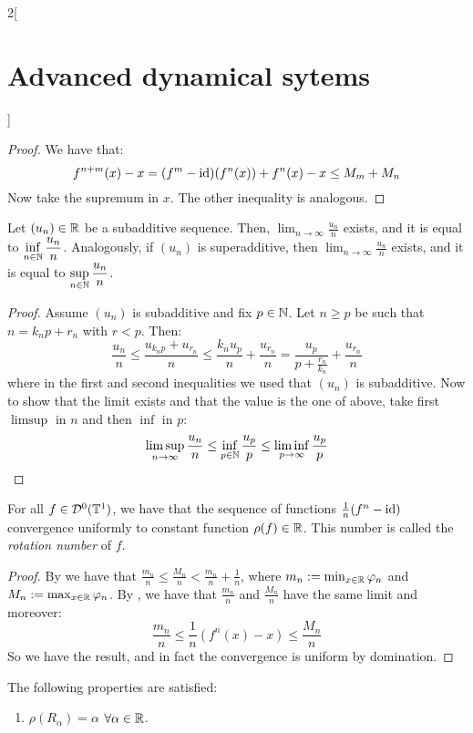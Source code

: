 \documentclass[../../../main_math.tex]{subfiles}
\begin{document}
\begin{multicols}{2}[\section{Advanced dynamical sytems}]
\begin{proof}
    We have that:
    \begin{equation*}
      f^{n+m}(x)-x=(f^m-\mathrm{id})(f^n(x))+f^n(x)-x\leq M_m+M_n
    \end{equation*}
    Now take the supremum in $x$. The other inequality is analogous.
  \end{proof}
  \begin{lemma}\label{ADS:lema3}
    Let $(u_n)\in\mathbb{R}$ be a subadditive sequence. Then, $\displaystyle\lim_{n\to\infty}\frac{u_n}{n}$ exists, and it is equal to $\displaystyle\inf_{n\in\mathbb{N}}\frac{u_n}{n}$. Analogously, if $(u_n)$ is superadditive, then $\displaystyle\lim_{n\to\infty}\frac{u_n}{n}$ exists, and it is equal to $\displaystyle\sup_{n\in\mathbb{N}}\frac{u_n}{n}$.
  \end{lemma}
  \begin{proof}
    Assume $(u_n)$ is subadditive and fix $p\in\mathbb{N}$. Let $n\geq p$ be such that $n=k_np+r_n$ with $r<p$. Then:
    $$
      \frac{u_n}{n}\leq \frac{u_{k_np}+u_{r_n}}{n}\leq \frac{k_nu_p}{n}+\frac{u_{r_n}}{n}=\frac{u_p}{p+\frac{r_n}{k_n}}+\frac{u_{r_n}}{n}
    $$
    where in the first and second inequalities we used that $(u_n)$ is subadditive. Now to show that the limit exists and that the value is the one of above, take first $\limsup$ in $n$ and then $\inf$ in $p$:
    $$
      \limsup_{n\to\infty}\frac{u_n}{n}\leq \inf_{p\in\mathbb{N}}\frac{u_p}{p}\leq \liminf_{p\to\infty}\frac{u_p}{p}
    $$
  \end{proof}
  \begin{theorem}
    For all $f\in \mathcal{D}^0(\mathbb{T}^1)$, we have that the sequence of functions $\frac{1}{n}(f^n-\mathrm{id})$ convergence uniformly to constant function $\rho(f)\in\mathbb{R}$. This number is called the \emph{rotation number} of $f$.
  \end{theorem}
  \begin{proof}
    By  we have that $\frac{m_n}{n}\leq \frac{M_n}{n}< \frac{m_n}{n}+\frac{1}{n}$, where $m_n:= \min_{x\in\mathbb{R}}\varphi_n$ and $M_n:= \max_{x\in\mathbb{R}}\varphi_n$. By , we have that $\frac{m_n}{n}$ and $\frac{M_n}{n}$ have the same limit and moreover:
    $$
      \frac{m_n}{n}\leq \frac{1}{n}(f^n(x)-x)\leq \frac{M_n}{n}
    $$
    So we have the result, and in fact the convergence is uniform by domination.
  \end{proof}
  \begin{proposition}
    The following properties are satisfied:
    \begin{enumerate}
      \item $\rho(R_\alpha)=\alpha$ $\forall\alpha\in\mathbb{R}$.

\end{enumerate}
\end{proposition}
\end{multicols}
\end{document}
